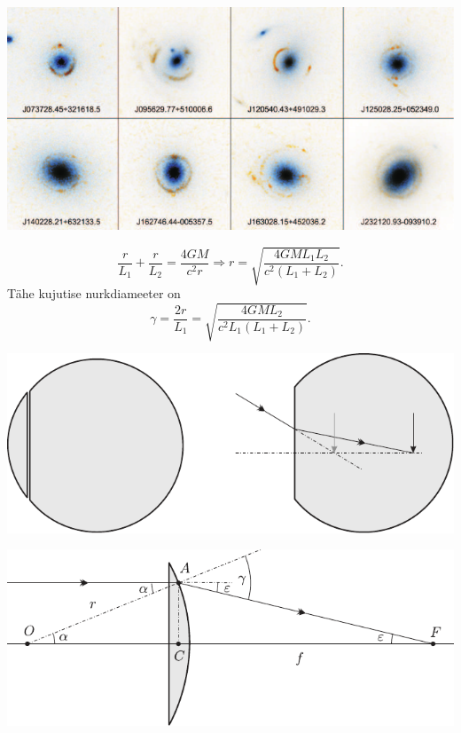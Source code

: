 \documentclass[10pt, twoside]{article}
\begin{document}
{\begin{center}
	\includegraphics[width=\textwidth]{2007-v2g-10-lah3}
\end{center}

\[
\frac{r}{L_{1}}+\frac{r}{L_{2}}=\frac{4 G M}{c^{2} r} \Rightarrow r=\sqrt{\frac{4 G M L_{1} L_{2}}{c^{2}\left(L_{1}+L_{2}\right)}}.
\]
Tähe kujutise nurkdiameeter on
\[
\gamma=\frac{2 r}{L_{1}}=\sqrt{\frac{4 G M L_{2}}{c^{2} L_{1}\left(L_{1}+L_{2}\right)}}.
\]
\probend
\bigskip


\solu
\begin{center}
	\includegraphics[width=\linewidth]{2005-lahg-10-lah1}
\end{center}

\begin{center}
	\includegraphics[width=\linewidth]{2005-lahg-10-lah2}
\end{center}

}
\end{document}
